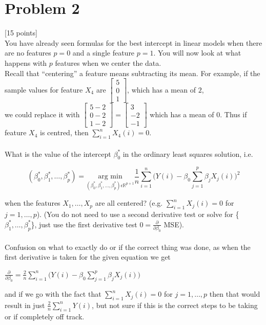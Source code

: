 \documentclass[12pt]{article}
\begin{document}
\section{Problem 2}
 [15 points]\\
You have already seen formulas for the best intercept in linear models when there are no
features $p = 0$ and a single feature $p = 1$. You will now look at what happens with $p$ features
when we center the data.\\
Recall that “centering” a feature means subtracting its mean. For example, if the sample values
for feature $X_4$ are $\begin{bmatrix} 5 \\0\\1\end{bmatrix}$, which has a mean of $2$, \\we could replace it with $\begin{bmatrix} 5 - 2\\0 - 2\\1 - 2\end{bmatrix} = \begin{bmatrix} 3\\-2\\-1\end{bmatrix}$ which has a mean of $0$. Thus if feature $X_4$ is centred, then $\sum^n_{i=1}X_4(i) = 0$.\\\\

What is the value of the intercept $\beta^*_0$ in the ordinary least squares solution, i.e.
\begin{center}
    \[
        (\beta^*_0, \beta^*_1, \dots, \beta^*_p) = \underset{(\beta^*_0, \beta^*_1, \dots, \beta^*_p)\epsilon\mathbb{R}^{p+1}}{\text{arg min}}\frac{1}{n}\sum_{i = 1}^{n} \bigg( Y(i) - \beta_0 \sum_{j=1}^p\beta_jX_j(i)\bigg) ^2
    \]
\end{center}
when the features ${X_1, \dots, X_p}$ are all centered? (e.g. $\sum_{i=1}^nX_j(i) = 0$ for $ j = 1, \dots, p$). (You do not need to use a second derivative test or solve for \{$\beta_1^*, \dots, \beta_p^*$\}, just use the first derivative test $0 = \frac{\partial}{\partial\beta_0}$ MSE).\\\\

Confusion on what to exactly do or if the correct thing was done, as when the first derivative is taken for the given equation we get

$\frac{\partial}{\partial\beta_0} = \frac{2}{n}\sum_{i = 1}^{n} \bigg( Y(i) - \beta_0 \sum_{j=1}^p\beta_jX_j(i)\bigg)$

and if we go with the fact that $\sum_{i=1}^nX_j(i) = 0$ for $ j = 1, \dots, p$ then that would result in just $\frac{2}{n}\sum_{i = 1}^{n} Y(i)$, but not sure if this is the correct steps to be taking or if completely off track.

\end{document}
